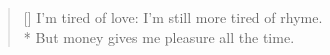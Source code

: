 \documentclass[MAIN]{subfiles}
\begin{document}
\settowidth{\versewidth}{The world's a stage. The trifling entrance fee}
\begin{verse}[\versewidth]
I'm tired of love: I'm still more tired of rhyme.\\* 
But money gives me pleasure all the time.
\end{verse}
\end{document}
